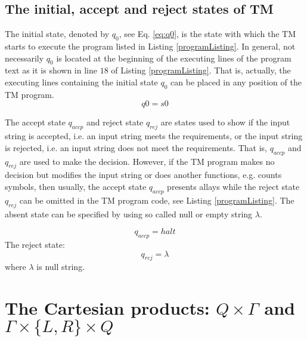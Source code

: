 \documentclass[12pt, a4paper, bibliography=totocnumbered]{report}
\begin{document}
	\subsection{The initial, accept and reject states of TM}
	{The initial state, denoted by $ q_0 $, see Eq. \eqref{eq:q0}, is the state with which the TM starts to execute the program listed in Listing \ref{programListing}. In general, not necessarily $ q_0 $ is located at the beginning of the executing lines of the program text as it is shown in line $ 18 $ of Listing \ref{programListing}. That is, actually, the executing lines containing the initial state $ q_0 $ can be placed in any position of the TM program.
	\begin{equation} \label{eq:q0}
		q0 = s0
	\end{equation}
	
	The accept state $ q_{accp} $ and reject state $ q_{rej} $ are states used to show if the input string is accepted, i.e. an input string meets the requirements, or the input string is rejected, i.e. an input string does not meet the requirements. That is, $ q_{accp} $ and $ q_{rej} $ are used to make the decision. However, if the TM program makes no decision but modifies the input string or does another functions, e.g. counts symbols, then usually, the accept state $ q_{accp} $ presents allays while the reject state $ q_{rej} $ can be omitted in the TM program code, see Listing \ref{programListing}. The absent state can be specified by using so called null or empty string $ \lambda $.
	
	\begin{equation}
		q_{accp} = halt
	\end{equation}
	{The reject state:}
	\begin{equation}\label{eq:q_rej}
			q_{rej} = \lambda
	\end{equation}
	where $\lambda$ is null string.
	

	\section{The Cartesian products: $Q \times \Gamma$ and $ \Gamma \times \{L, R\} \times Q $}
	
}
\end{document}
